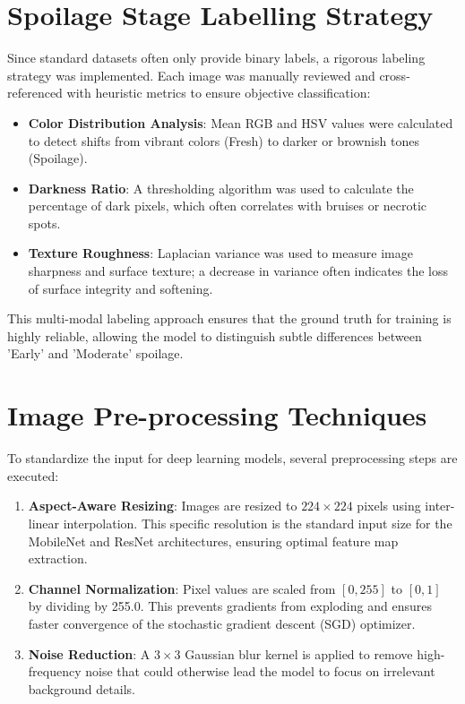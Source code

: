 \section[Spoilage Stage Labelling Strategy]{\textbf{Spoilage Stage Labelling Strategy}}
Since standard datasets often only provide binary labels, a rigorous labeling strategy was implemented. Each image was manually reviewed and cross-referenced with heuristic metrics to ensure objective classification:
\begin{itemize}
    \item \textbf{Color Distribution Analysis}: Mean RGB and HSV values were calculated to detect shifts from vibrant colors (Fresh) to darker or brownish tones (Spoilage).
    \item \textbf{Darkness Ratio}: A thresholding algorithm was used to calculate the percentage of dark pixels, which often correlates with bruises or necrotic spots.
    \item \textbf{Texture Roughness}: Laplacian variance was used to measure image sharpness and surface texture; a decrease in variance often indicates the loss of surface integrity and softening.
\end{itemize}
This multi-modal labeling approach ensures that the ground truth for training is highly reliable, allowing the model to distinguish subtle differences between 'Early' and 'Moderate' spoilage.

\section[Image Pre-processing Techniques]{\textbf{Image Pre-processing Techniques}}
To standardize the input for deep learning models, several preprocessing steps are executed:
\begin{enumerate}
    \item \textbf{Aspect-Aware Resizing}: Images are resized to $224 \times 224$ pixels using inter-linear interpolation. This specific resolution is the standard input size for the MobileNet and ResNet architectures, ensuring optimal feature map extraction.
    \item \textbf{Channel Normalization}: Pixel values are scaled from $[0, 255]$ to $[0, 1]$ by dividing by 255.0. This prevents gradients from exploding and ensures faster convergence of the stochastic gradient descent (SGD) optimizer.
    \item \textbf{Noise Reduction}: A $3 \times 3$ Gaussian blur kernel is applied to remove high-frequency noise that could otherwise lead the model to focus on irrelevant background details.
\end{enumerate}

